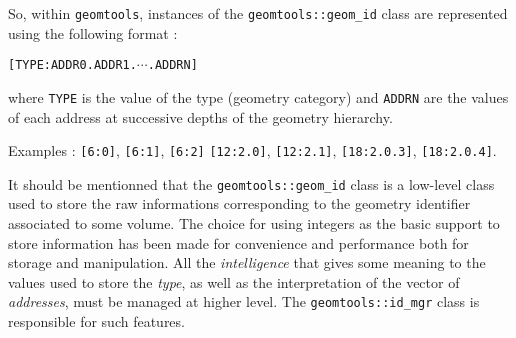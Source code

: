 \pn    So,    within     \texttt{geomtools},    instances    of    the
\texttt{geomtools::geom\_id} class are represented using the following
format :
\begin{center}
\verb+[TYPE:ADDR0.ADDR1.+$\cdots$\verb+.ADDRN]+
\end{center}
\pn where \verb+TYPE+ is the value of the type (geometry category) and
\verb+ADDRN+ are  the values of each  address at successive  depths of the
geometry hierarchy.

\pn Examples : \verb+[6:0]+,  \verb+[6:1]+, \verb+[6:2]+
\verb+[12:2.0]+, \verb+[12:2.1]+, \verb+[18:2.0.3]+, \verb+[18:2.0.4]+.

\pn  It  should be  mentionned  that the  \texttt{geomtools::geom\_id}
class  is  a  low-level  class  used to  store  the  raw  informations
corresponding to  the geometry  identifier associated to  some volume.
The  choice  for  using  integers   as  the  basic  support  to  store
information  has been made  for convenience  and performance  both for
storage and  manipulation.  All  the \emph{intelligence} that  gives some
meaning to  the values used to  store the \emph{type}, as  well as the
interpretation of  the vector of \emph{addresses}, must  be managed at
higher  level.  The  \texttt{geomtools::id\_mgr} class  is responsible
for such features.

